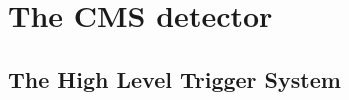\chapter{The CMS detector} %
\label{cha:the_cms_detector}

\section{The High Level Trigger System} %
\label{sec:the_high_level_trigger_system}


